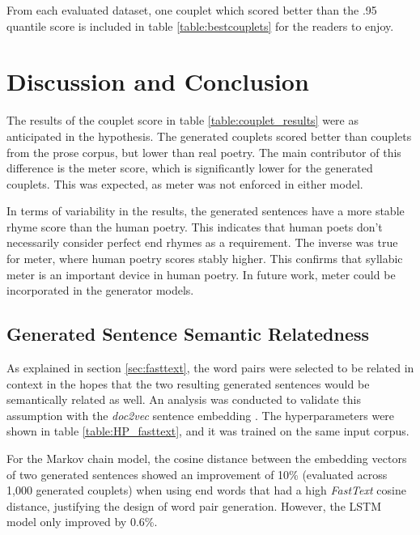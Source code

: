 \documentclass[11pt,a4paper]{article}
\begin{document}
From each evaluated dataset, one couplet which scored better than the .95 quantile score is included in table \ref{table:bestcouplets} for the readers to enjoy.

\section{Discussion and Conclusion}
\label{sec:discconc}

The results of the couplet score in table \ref{table:couplet_results} were as anticipated in the hypothesis. The generated couplets scored better than couplets from the prose corpus, but lower than real poetry. The main contributor of this difference is the meter score, which is significantly lower for the generated couplets. This was expected, as meter was not enforced in either model.

In terms of variability in the results, the generated sentences have a more stable rhyme score than the human poetry. This indicates that human poets don't necessarily consider perfect end rhymes as a requirement. The inverse was true for meter, where human poetry scores stably higher. This confirms that syllabic meter is an important device in human poetry. In future work, meter could be incorporated in the generator models.

\subsection{Generated Sentence Semantic Relatedness}
\label{sec:doc2vec}

As explained in section \ref{sec:fasttext}, the word pairs were selected to be related in context in the hopes that the two resulting generated sentences would be semantically related as well. An analysis was conducted to validate this assumption with the \textit{doc2vec} sentence embedding \cite{docvec}. The hyperparameters were shown in table \ref{table:HP_fasttext}, and it was trained on the same input corpus.

For the Markov chain model, the cosine distance between the embedding vectors of two generated sentences showed an improvement of 10\% (evaluated across 1,000 generated couplets) when using end words that had a high \textit{FastText} cosine distance, justifying the design of word pair generation. However, the LSTM model only improved by 0.6\%.

\end{document}
